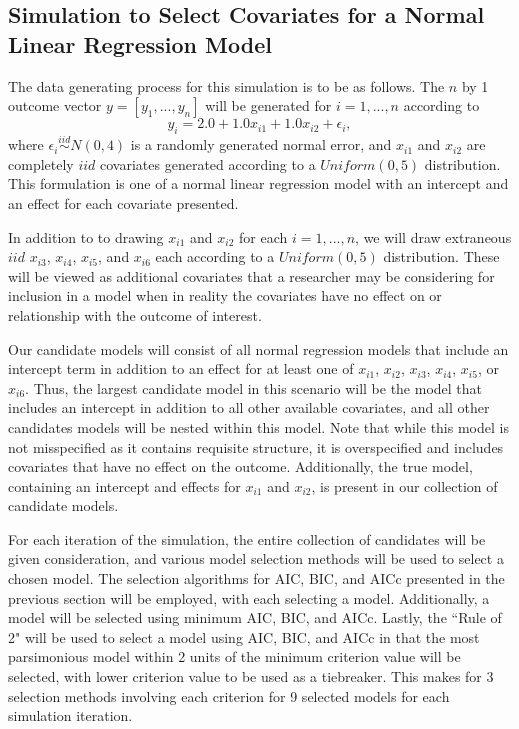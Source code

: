 		\subsection{Simulation to Select Covariates for a Normal Linear Regression Model}

		The data generating process for this simulation is to be as follows. The $n$ by 1 outcome vector $y = [y_1,...,y_n]$ will be generated for $i = 1,...,n$ according
		to
		\begin{equation*}
			y_i = 2.0 + 1.0 x_{i1} + 1.0 x_{i2} + \epsilon_i , 
		\end{equation*}
		where $\epsilon_i \stackrel{iid}{\sim} N(0,4)$ is a randomly generated normal error, and $x_{i1}$ and $x_{i2}$ are completely $iid$ covariates generated according to
		a $Uniform(0,5)$ distribution. This formulation is one of a normal linear regression model with an intercept and an effect for each covariate presented.

		In addition to to drawing $x_{i1}$ and $x_{i2}$ for each $i=1,...,n$, we will draw extraneous $iid$ $x_{i3}$, $x_{i4}$, $x_{i5}$, and $x_{i6}$ each according to a
		$Uniform(0,5)$ distribution. These will be viewed as additional covariates that a researcher may be considering for inclusion in a model when in reality the covariates have
		no effect on or relationship with the outcome of interest.
		
		Our candidate models will consist of all normal regression models that include an intercept term in addition to an effect for at least one of 
		$x_{i1}$, $x_{i2}$, $x_{i3}$, $x_{i4}$, $x_{i5}$, or $x_{i6}$. Thus, the largest candidate model in this scenario will be the model that includes an intercept
		in addition to all other available covariates, and all other candidates models will be nested within this model. Note that while this model is not
		misspecified as it contains requisite structure, it is overspecified and includes covariates that have no effect on the outcome. Additionally, the
		true model, containing an intercept and effects for $x_{i1}$ and $x_{i2}$, is present in our collection of candidate models.

		For each iteration of the simulation, the entire collection of candidates will be given consideration, and various model selection methods will be
		used to select a chosen model. The selection algorithms for AIC, BIC, and AICc presented in the previous section will be employed, with each selecting a model.
		Additionally, a model will be selected using minimum AIC, BIC, and AICc. Lastly, the ``Rule of 2" will be used to select a model using AIC,
		BIC, and AICc in that the most parsimonious model within 2 units of the minimum criterion value will be selected, with lower criterion value to be used as a 
		tiebreaker. This makes for 3 selection methods involving each criterion for 9 selected models for each simulation iteration.

